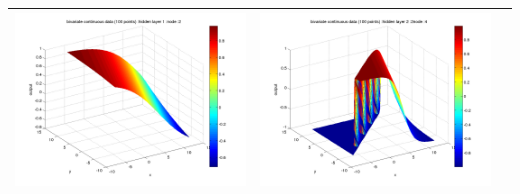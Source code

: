 \documentclass[fleqn]{article}
\begin{document}
\begin{center}
\begin{longtable}{ c | c | r }
    \includegraphics[scale=0.25]{./pics/bivariate100/_2_4/_2_4_epoch_10_hidden layer 1 :2} &   \includegraphics[scale=0.25]{./pics/bivariate100/_2_4/_2_4_epoch_10_hidden layer 2 :24} & \\
   \hline
  \end{longtable}
\end{center}
\end{document}
